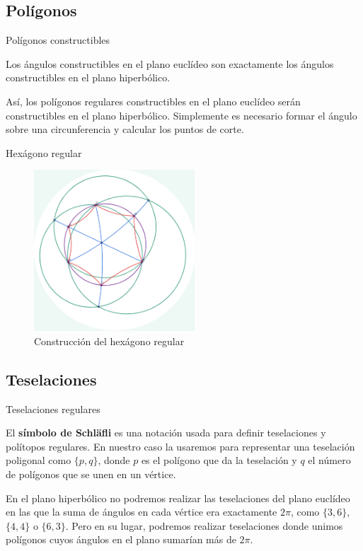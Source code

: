 \documentclass[compress]{beamer}
\begin{document}
\subsection{Polígonos}
\begin{frame}{Polígonos constructibles}
  \begin{theorem}
    Los ángulos constructibles en el plano euclídeo son exactamente los ángulos
    constructibles en el plano hiperbólico. \cite{jagy95}
  \end{theorem}
  
  Así, los polígonos regulares constructibles en el plano euclídeo serán
  constructibles en el plano hiperbólico. Simplemente es necesario
  formar el ángulo sobre una circunferencia y calcular los puntos de corte.
\end{frame}

\begin{frame}{Hexágono regular}
  \begin{figure}[ht!]
    \centering
    \includegraphics[width=60mm]{./hexagon.png}
    \caption{Construcción del hexágono regular \label{hexagon}}
  \end{figure}
\end{frame}


\subsection{Teselaciones}

\begin{frame}{Teselaciones regulares}
\begin{definition}
  El \textbf{símbolo de Schläfli} es una notación usada para definir
  teselaciones y polítopos regulares. En nuestro caso la usaremos para
  representar una teselación poligonal como $\{p,q\}$, donde $p$ es el
  polígono que da la teselación y $q$ el número de polígonos que se unen
  en un vértice.
\end{definition}

En el plano hiperbólico no podremos realizar las teselaciones del
plano euclídeo en las que la suma de ángulos en cada vértice era
exactamente $2\pi$, como $\{3,6\}$, $\{4,4\}$ o $\{6,3\}$. Pero en su
lugar, podremos realizar teselaciones donde unimos polígonos cuyos
ángulos en el plano sumarían más de $2\pi$.
\end{frame}
\end{document}
